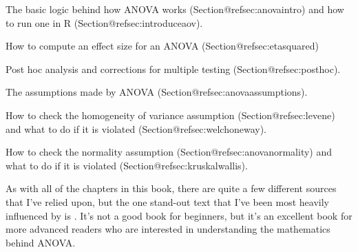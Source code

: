  \itemsep -2pt
\item The basic logic behind how ANOVA works (Section@refsec:anovaintro) and how to run one in R (Section@refsec:introduceaov).
\item How to compute an effect size for an ANOVA (Section@refsec:etasquared)
\item Post hoc analysis and corrections for multiple testing (Section@refsec:posthoc).
\item The assumptions made by ANOVA (Section@refsec:anovaassumptions).
\item How to check the homogeneity of variance assumption (Section@refsec:levene) and what to do if it is violated (Section@refsec:welchoneway).
\item How to check the normality assumption (Section@refsec:anovanormality) and what to do if it is violated (Section@refsec:kruskalwallis).


As with all of the chapters in this book, there are quite a few different sources that I've relied upon, but the one stand-out text that I've been most heavily influenced by is . It's not a good book for beginners, but it's an excellent book for more advanced readers who are interested in understanding the mathematics behind ANOVA. 




